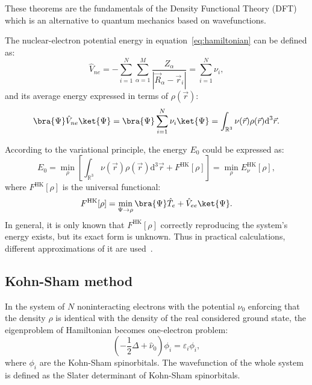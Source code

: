 These theorems are the fundamentals of the Density Functional Theory (DFT) which is an alternative to quantum mechanics based on wavefunctions.

The nuclear-electron potential energy in equation~\ref{eq:hamiltonian} can be defined as:
\begin{equation}
    \hat{V}_{ne} = -\sum_{i = 1}^N \sum_{\alpha = 1}^M \frac{Z_{\alpha}}{\left| \vec{R}_{\alpha} - \vec{r}_i \right|} = \sum_{i = 1}^N \nu_i,
\end{equation}
and its average energy expressed in terms of $\rho(\vec{r})$:
\begin{equation}
    \bra{\Psi} \hat{V}_{ne} \ket{\Psi} = \bra{\Psi} \sum_{i = 1}^N \nu_i \ket{\Psi} = \int_{\mathbb{R}^3} \nu(\vec{r}) \rho(\vec{r}) \text{d}^3 \vec{r}.
\end{equation}

According to the variational principle, the energy $E_0$ could be expressed as:
\begin{equation}
    E_0 = \min_{\rho} \left[ \int_{\mathbb{R}^3} \nu(\vec{r}) \rho(\vec{r}) \text{d}^3 \vec{r} + F^{\text{HK}}[\rho] \right] = \min_{\rho} E_{\nu}^{\text{HK}}[\rho],
\end{equation}
where $F^{\text{HK}}[\rho]$ is the universal functional:
\begin{equation}
    F^{\text{HK}}[\rho] = \min_{\Psi \rightarrow \rho} \bra{\Psi} \hat{T}_e + \hat{V}_{ee} \ket{\Psi}.
\end{equation}
In general, it is only known that $F^{\text{HK}}[\rho]$ correctly reproducing the system's energy exists, but its exact form is unknown. Thus in practical calculations, different approximations of it are used~\cite{nalewajski-perspectives}.

\subsection{Kohn-Sham method}

In the system of $N$ noninteracting electrons with the potential $\nu_0$ enforcing that the density $\rho$ is identical with the density of the real considered ground state, the eigenproblem of Hamiltonian becomes one-electron problem:
\begin{equation}
    \left( -\frac{1}{2} \Delta + \hat{\nu}_0 \right) \phi_i = \varepsilon_i \phi_i,
\end{equation}
where $\phi_i$ are the Kohn-Sham spinorbitals. The wavefunction of the whole system is defined as the Slater determinant of Kohn-Sham spinorbitals.

